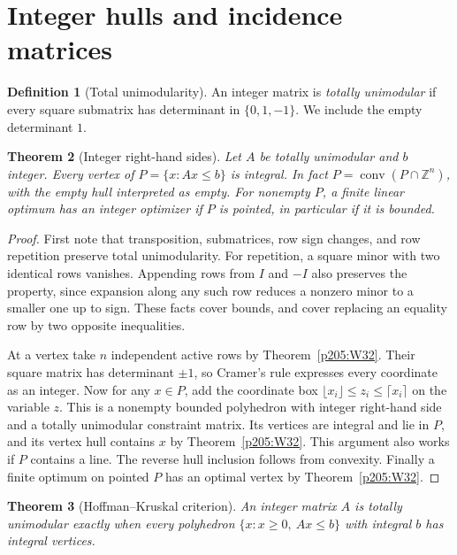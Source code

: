 \documentclass[11pt,oneside,openany]{book}
\theoremstyle{plain}
\newtheorem{theorem}{Theorem}[chapter]
\theoremstyle{definition}
\newtheorem{definition}[theorem]{Definition}
\theoremstyle{remark}
\begin{document}
\section{Integer hulls and incidence matrices}

\begin{definition}[Total unimodularity]\label{p205:W33}
An integer matrix is \emph{totally unimodular} if every square
submatrix has determinant in \(\{0,1,-1\}\). We include the
empty determinant \(1\).
\end{definition}

\begin{theorem}[Integer right-hand sides]\label{p205:integer-hull}
Let \(A\) be totally unimodular and \(b\) integer.
Every vertex of \(P=\{x:Ax\le b\}\) is integral. In fact
\(P=\operatorname{conv}(P\cap\mathbb Z^n)\), with the empty
hull interpreted as empty. For nonempty \(P\), a finite
linear optimum has an integer optimizer if \(P\) is pointed,
in particular if it is bounded.
\end{theorem}

\begin{proof}
First note that transposition, submatrices, row sign changes,
and row repetition preserve total unimodularity. For repetition,
a square minor with two identical rows vanishes. Appending rows
from \(I\) and \(-I\) also preserves the property, since expansion
along any such row reduces a nonzero minor to a smaller one up to
sign. These facts cover bounds, and cover replacing an equality
row by two opposite inequalities.

At a vertex take \(n\) independent active rows by
Theorem~\ref{p205:W32}. Their square matrix has determinant
\(\pm1\), so Cramer's rule expresses every coordinate as an integer.
Now for any \(x\in P\), add the coordinate box
\(\lfloor x_i\rfloor\le z_i\le\lceil x_i\rceil\) on the variable
\(z\). This is a nonempty bounded polyhedron with integer right-hand
side and a totally unimodular constraint matrix. Its vertices are
integral and lie in \(P\), and its vertex hull contains \(x\)
by Theorem~\ref{p205:W32}. This argument also works if \(P\) contains
a line. The reverse hull inclusion follows from convexity. Finally
a finite optimum on pointed \(P\) has an optimal vertex by
Theorem~\ref{p205:W32}.
\end{proof}

\begin{theorem}[Hoffman--Kruskal criterion]\label{p205:W34}
An integer matrix \(A\) is totally unimodular exactly when every
polyhedron \(\{x:x\ge0,\ Ax\le b\}\) with integral \(b\) has
integral vertices.
\end{theorem}
\end{document}

